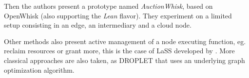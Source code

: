\documentclass[11pt]{sdm}
\begin{document}
\begin{description}
		Then the authors present a prototype named \emph{AuctionWhisk}, based on OpenWhisk (also supporting the \emph{Lean} flavor). They experiment on a limited setup consisting in an edge, an intermediary and a cloud node.


\end{description}

Other methods also present active management of a node executing function, eg. reclaim resources or grant more, this is the case of \gls{LaSS} developed by \citet{wang_lass_2021}. More classical approaches are also taken, as  DROPLET that uses an underlying graph optimization algorithm.







\end{document}
